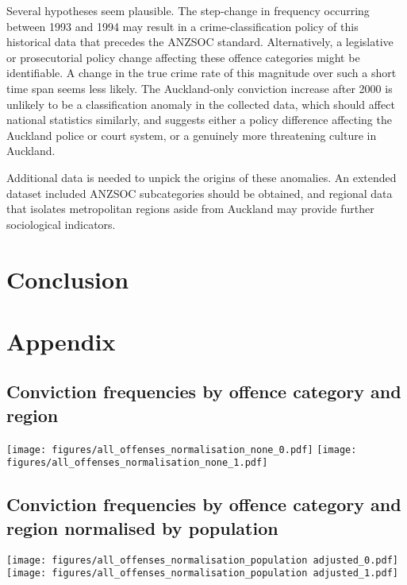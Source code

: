 \documentclass[onecolumn]{myarticle}
\begin{document}
Several hypotheses seem plausible.  
The step-change in frequency occurring between 1993 and 1994 may result in a crime-classification policy of this historical data that precedes the ANZSOC standard.
Alternatively, a legislative or prosecutorial policy change affecting these offence categories might be identifiable.
A change in the true crime rate of this magnitude over such a short time span seems less likely.
The Auckland-only conviction increase after 2000 is unlikely to be a classification anomaly in the collected data, which should affect national statistics similarly, and suggests either a policy difference affecting the Auckland police or court system, or a genuinely more threatening culture in Auckland.

Additional data is needed to unpick the origins of these anomalies.
An extended dataset included ANZSOC subcategories should be obtained, and regional data that isolates metropolitan regions aside from Auckland may provide further sociological indicators.

\section*{Conclusion}



\newpage
\section*{Appendix}
\centering
\subsection*{Conviction frequencies by offence category and region}
\texttt{[image: figures/all\_offenses\_normalisation\_none\_0.pdf]}
\newpage
\texttt{[image: figures/all\_offenses\_normalisation\_none\_1.pdf]}
\newpage

\subsection*{Conviction frequencies by offence category and region normalised by population}
  \texttt{[image: figures/all\_offenses\_normalisation\_population adjusted\_0.pdf]}
\newpage
  \texttt{[image: figures/all\_offenses\_normalisation\_population adjusted\_1.pdf]}
\newpage
\end{document}
